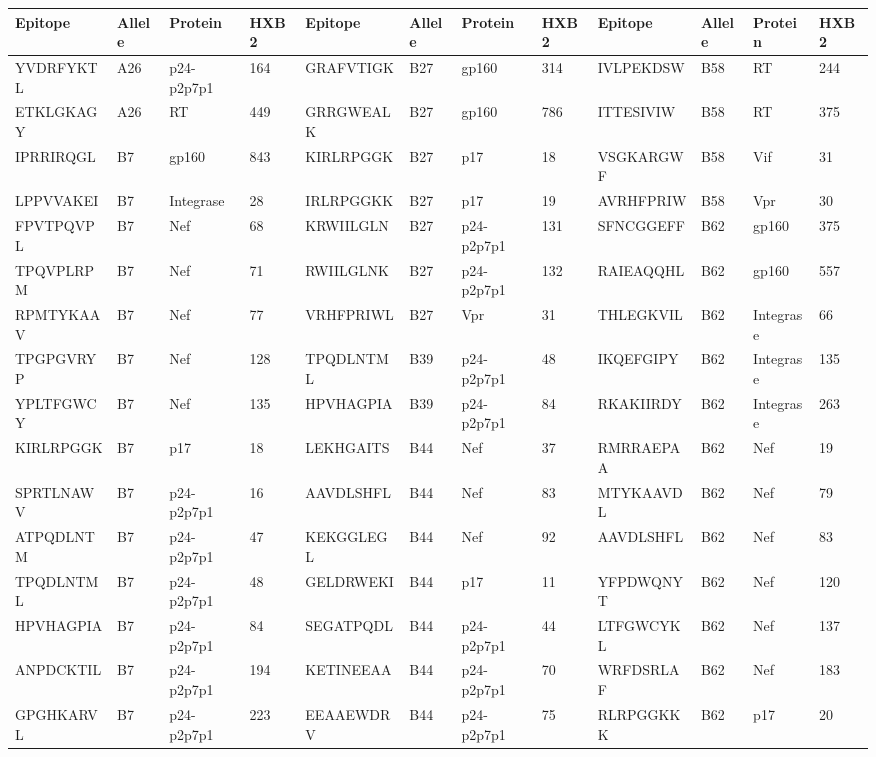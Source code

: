 \begin{table}[htp]
\begin{center}
\begin{sideways}
{
\scriptsize
\begin{tabulary}{1.5\textwidth}{|l|l|l|l|l|l|l|l|l|l|l|l|}
\hline
Epitope & Allele & Protein & HXB2 & Epitope & Allele & Protein & HXB2 & Epitope & Allele & Protein & HXB2 \bigstrut \\
\hline
YVDRFYKTL & A26 & p24-p2p7p1 & 164 & GRAFVTIGK & B27 & gp160 & 314 & IVLPEKDSW & B58 & RT & 244 \bigstrut[t] \\
ETKLGKAGY & A26 & RT & 449 & GRRGWEALK & B27 & gp160 & 786 & ITTESIVIW & B58 & RT & 375 \\
IPRRIRQGL & B7 & gp160 & 843 & KIRLRPGGK & B27 & p17 & 18 & VSGKARGWF & B58 & Vif & 31 \\
LPPVVAKEI & B7 & Integrase & 28 & IRLRPGGKK & B27 & p17 & 19 & AVRHFPRIW & B58 & Vpr & 30 \\
FPVTPQVPL & B7 & Nef & 68 & KRWIILGLN & B27 & p24-p2p7p1 & 131 & SFNCGGEFF & B62 & gp160 & 375 \\
TPQVPLRPM & B7 & Nef & 71 & RWIILGLNK & B27 & p24-p2p7p1 & 132 & RAIEAQQHL & B62 & gp160 & 557 \\
RPMTYKAAV & B7 & Nef & 77 & VRHFPRIWL & B27 & Vpr & 31 & THLEGKVIL & B62 & Integrase & 66 \\
TPGPGVRYP & B7 & Nef & 128 & TPQDLNTML & B39 & p24-p2p7p1 & 48 & IKQEFGIPY & B62 & Integrase & 135 \\
YPLTFGWCY & B7 & Nef & 135 & HPVHAGPIA & B39 & p24-p2p7p1 & 84 & RKAKIIRDY & B62 & Integrase & 263 \\
KIRLRPGGK & B7 & p17 & 18 & LEKHGAITS & B44 & Nef & 37 & RMRRAEPAA & B62 & Nef & 19 \\
SPRTLNAWV & B7 & p24-p2p7p1 & 16 & AAVDLSHFL & B44 & Nef & 83 & MTYKAAVDL & B62 & Nef & 79 \\
ATPQDLNTM & B7 & p24-p2p7p1 & 47 & KEKGGLEGL & B44 & Nef & 92 & AAVDLSHFL & B62 & Nef & 83 \\
TPQDLNTML & B7 & p24-p2p7p1 & 48 & GELDRWEKI & B44 & p17 & 11 & YFPDWQNYT & B62 & Nef & 120 \\
HPVHAGPIA & B7 & p24-p2p7p1 & 84 & SEGATPQDL & B44 & p24-p2p7p1 & 44 & LTFGWCYKL & B62 & Nef & 137 \\
ANPDCKTIL & B7 & p24-p2p7p1 & 194 & KETINEEAA & B44 & p24-p2p7p1 & 70 & WRFDSRLAF & B62 & Nef & 183 \\
GPGHKARVL & B7 & p24-p2p7p1 & 223 & EEAAEWDRV & B44 & p24-p2p7p1 & 75 & RLRPGGKKK & B62 & p17 & 20 \\

\end{tabulary}}
\end{sideways}
\end{center}
\end{table}
